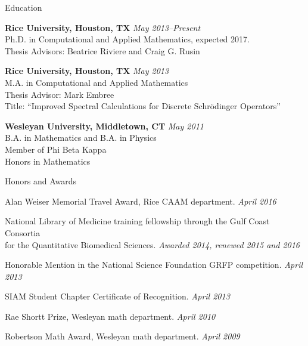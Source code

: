 \documentclass{resume} %
\begin{document}

\begin{rSection}{Education}

{\bf Rice University, Houston, TX} \hfill {\em May 2013--Present} \\ 
Ph.D. in Computational and Applied Mathematics, expected 2017. \\
Thesis Advisors: Beatrice Riviere and Craig G. Rusin 

{\bf Rice University, Houston, TX} \hfill {\em May 2013} \\
M.A. in Computational and Applied Mathematics \\
Thesis Advisor: Mark Embree \\
Title: ``Improved Spectral Calculations for Discrete Schr\"odinger Operators''

{\bf Wesleyan University, Middletown, CT} \hfill {\em May 2011} \\
B.A. in Mathematics and B.A. in Physics \\
Member of Phi Beta Kappa \\
Honors in Mathematics


\end{rSection}


\begin{rSection}{Honors and Awards}

Alan Weiser Memorial Travel Award, Rice CAAM department. \hfill{\em April 2016}

National Library of Medicine training fellowship through the Gulf Coast Consortia \\ for the Quantitative Biomedical Sciences. \hfill {\em Awarded 2014, renewed 2015 and 2016}

Honorable Mention in the National Science Foundation GRFP competition. \hfill {\em April 2013}

SIAM Student Chapter Certificate of Recognition. \hfill {\em April 2013} 

Rae Shortt Prize, Wesleyan math department. \hfill{\em April 2010} 

Robertson Math Award, Wesleyan math department.  \hfill {\em April 2009} 

\end{rSection}
\end{document}
